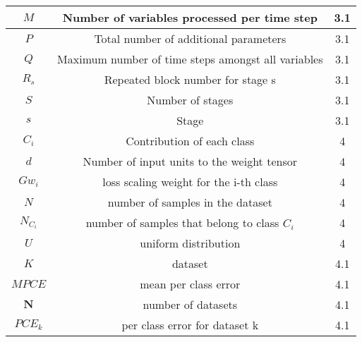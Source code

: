 \documentclass[preprint,12pt,3p]{elsarticle}
\begin{document}
\begin{table*}[htpb]
\begin{adjustbox}{width=0.71 \linewidth}
\begin{tabularx}{1.55 \textwidth}{|c|C|c|}
    \hline
    $M$   & Number of variables processed per time step & 3.1 \\
    \hline
    $P$   & Total number of additional parameters & 3.1 \\
    \hline
    $Q$   & Maximum number of time steps amongst all variables & 3.1 \\
    \hline
    $R_s$ & Repeated block number for stage s & 3.1 \\
    \hline
    $S$   & Number of stages & 3.1 \\
    \hline
    $s$   & Stage & 3.1 \\
    \hline
    $C_i$ & Contribution of each class & 4 \\
    \hline
    $d$   & Number of input units to the weight tensor & 4 \\
    \hline
    $Gw_i$ & loss scaling weight for the i-th class & 4 \\
    \hline
    $N$   & number of samples in the dataset & 4 \\
    \hline
    $N_{C_i}$ & number of samples that belong to class $C_i$ & 4 \\
    \hline
    $U$   & uniform distribution & 4 \\
    \hline
    $K$   & dataset & 4.1 \\
    \hline
    $MPCE$ & mean per class error & 4.1 \\
    \hline
    $\textbf{N}$   & number of datasets & 4.1 \\
    \hline
    $PCE_k$ & per class error for dataset k & 4.1 \\
    \hline


    \end{tabularx}
    \end{adjustbox}
  \label{appendtab:1}

\end{table*}%




\end{document}
